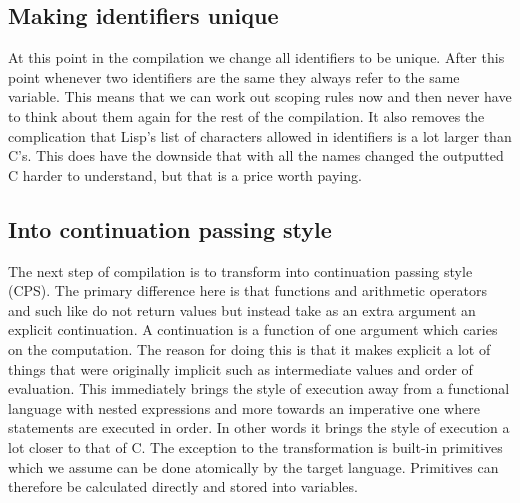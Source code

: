 \documentclass[a4paper]{article}
\begin{document}

\subsection{Making identifiers unique}

At this point in the compilation we change all identifiers to be unique. After this point whenever two identifiers are the same they always refer to the same variable. This means that we can work out scoping rules now and then never have to think about them again for the rest of the compilation. It also removes the complication that Lisp's list of characters allowed in identifiers is a lot larger than C's. This does have the downside that with all the names changed the outputted C harder to understand, but that is a price worth paying.




\subsection{Into continuation passing style}

The next step of compilation is to transform into continuation passing style (CPS). The primary difference here is that functions and arithmetic operators and such like do not return values but instead take as an extra argument an explicit continuation. A continuation is a function of one argument which caries on the computation. The reason for doing this is that it makes explicit a lot of things that were originally implicit such as intermediate values and order of evaluation. This immediately brings the style of execution away from a functional language with nested expressions and more towards an imperative one where statements are executed in order. In other words it brings the style of execution a lot closer to that of C. The exception to the transformation is built-in primitives which we assume can be done atomically by the target language. Primitives can therefore be calculated directly and stored into variables.
\end{document}
